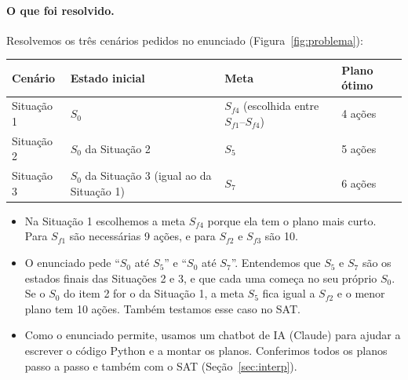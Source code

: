 \documentclass[11pt,a4paper]{article}
\begin{document}
\paragraph{O que foi resolvido.} Resolvemos os três cenários pedidos no enunciado
(Figura~\ref{fig:problema}):
\begin{center}\small
\begin{tabular}{@{}llll@{}}
\toprule
Cenário & Estado inicial & Meta & Plano ótimo\\
\midrule
Situação 1 & $S_0$ & $S_{f4}$ (escolhida entre $S_{f1}$--$S_{f4}$) & 4 ações\\
Situação 2 & $S_0$ da Situação 2 & $S_5$ & 5 ações\\
Situação 3 & $S_0$ da Situação 3 (igual ao da Situação 1) & $S_7$ & 6 ações\\
\bottomrule
\end{tabular}
\end{center}
\begin{itemize}
  \item Na Situação 1 escolhemos a meta $S_{f4}$ porque ela tem o plano mais
        curto. Para $S_{f1}$ são necessárias 9 ações, e para $S_{f2}$ e $S_{f3}$
        são 10.
  \item O enunciado pede ``$S_0$ até $S_5$'' e ``$S_0$ até $S_7$''. Entendemos que
        $S_5$ e $S_7$ são os estados finais das Situações 2 e 3, e que cada uma
        começa no seu próprio $S_0$. Se o $S_0$ do item 2 for o da Situação 1, a
        meta $S_5$ fica igual a $S_{f2}$ e o menor plano tem 10 ações. Também
        testamos esse caso no SAT.
  \item Como o enunciado permite, usamos um chatbot de IA (Claude) para ajudar a
        escrever o código Python e a montar os planos. Conferimos todos os planos
        passo a passo e também com o SAT (Seção~\ref{sec:interp}).
\end{itemize}
\end{document}
